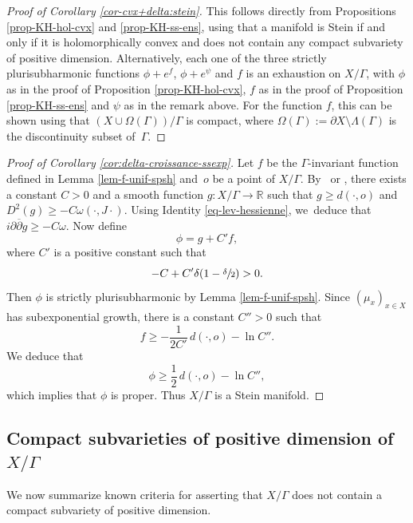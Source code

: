 \documentclass[11pt]{article}
\theoremstyle{definition}
\newcommand{\R}{\mathbb{R}}
\begin{document}
\begin{proof}[Proof of Corollary \ref{cor-cvx+delta:stein}]
This follows directly from Propositions \ref{prop-KH-hol-cvx} and \ref{prop-KH-ss-ens}, using that a manifold is Stein if and only if it is holomorphically convex and does not contain any compact subvariety of positive dimension. Alternatively, each one of the three strictly plurisubharmonic functions $\phi+e^{f}$, $\phi+e^{\psi}$ and $f$ is an exhaustion on $X/\Gamma$, with $\phi$ as in the proof of Proposition \ref{prop-KH-hol-cvx}, $f$ as in the proof of Proposition \ref{prop-KH-ss-ens} and $\psi$ as in the remark above. For the function $f$, this can be shown using that $(X\cup\Omega(\Gamma))/\Gamma$ is compact, where $\Omega(\Gamma):= \partial X\setminus \Lambda(\Gamma)$ is the discontinuity subset of~$\Gamma$.
\end{proof}

\begin{proof}[Proof of Corollary \ref{cor:delta-croissance-ssexp}]
Let $f$ be the $\Gamma$\nobreakdash-invariant function defined in Lemma \ref{lem-f-unif-spsh} and~$o$ be a point of $X/\Gamma$. By~\cite{tamExhaustionFunctionsComplete2010} or \cite[\S4 of Ch.\,26]{chowRicciFlowTechniques2010}, there exists a constant $C>0$ and a smooth function $g:X/\Gamma \to \R$ such that $g\ge d(\cdot,o)$ and \hbox{$D^{2}(g)\ge -C\omega(\cdot,J\cdot)$}. Using Identity \eqref{eq-lev-hessienne}, we~deduce that $i\partial\overline{\partial}g\ge -C\omega$. Now define
\begin{equation*}
\phi = g + C'f,
\end{equation*}
where $C'$ is a positive constant such that
\begin{equation*}
-C+C'\delta(1-\sfrac{\delta}{2})>0.
\end{equation*}
Then $\phi$ is strictly plurisubharmonic by Lemma \ref{lem-f-unif-spsh}. Since $(\mu_x)_{x\in X}$ has subexponential growth, there is a constant $C''>0$ such that
\begin{equation*}
f\ge -\frac{1}{2C'}\,d(\cdot,o) -\ln C''.
\end{equation*}
We deduce that
\begin{equation*}
\phi \ge \frac{1}{2}\,d(\cdot,o) -\ln C'',
\end{equation*}
which implies that $\phi$ is proper. Thus $X/\Gamma$ is a Stein manifold.
\end{proof}

\subsection{Compact subvarieties of positive dimension of $X/\Gamma$}\label{ss-section-criteres}
We now summarize known criteria for asserting that $X/\Gamma$ does not contain a compact subvariety of positive dimension.
\end{document}
